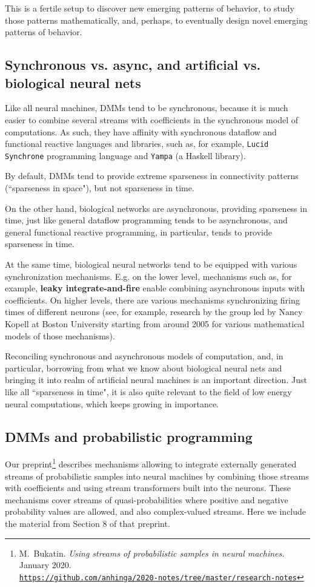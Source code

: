 \documentclass{article}
\begin{document}
This is a fertile setup to discover new emerging patterns of behavior, to study those patterns mathematically,
and, perhaps, to eventually design novel emerging patterns of behavior.

\subsection{Synchronous vs. async, and artificial vs. biological neural nets}

Like all neural machines, DMMs tend to be synchronous, because it is much easier to combine
several streams with coefficients in the synchronous model of computations. As such, they have affinity with
synchronous dataflow and functional reactive languages and libraries, such as, for example,
{\tt Lucid Synchrone} programming language and {\tt Yampa} (a Haskell library).

By default, DMMs tend to provide extreme sparseness in connectivity patterns (``sparseness in space"),
but not sparseness in time. 

On the other hand, biological networks are asynchronous, providing sparseness in time, just like
general dataflow programming tends to be asynchronous, and general functional reactive programming,
in particular, tends to provide sparseness in time.

At the same time, biological neural networks tend to be equipped with various synchronization mechanisms.
E.g. on the lower level, mechanisms such as, for example, {\bf leaky integrate-and-fire} enable combining
asynchronous inputs with coefficients. On higher levels, there are various mechanisms synchronizing firing times
of different neurons (see, for example, research by the group led by Nancy Kopell at Boston University starting from
around 2005 for various mathematical models of those mechanisms).

Reconciling synchronous and asynchronous models of computation, and, in particular, borrowing from
what we know about biological neural nets and bringing it into realm of artificial neural machines is
an important direction. Just like all ``sparseness in time", it is also quite relevant to the field of low energy
neural computations, which keeps growing in importance.

\subsection{DMMs and probabilistic programming}

Our preprint\footnote{M.~Bukatin. {\em Using streams of probabilistic samples in neural machines.} January 2020.\\
\href{https://github.com/anhinga/2020-notes/tree/master/research-notes}{\tt https://github.com/anhinga/2020-notes/tree/master/research-notes}} describes mechanisms allowing to integrate externally generated streams of
probabilistic samples into neural machines by
combining those streams with coefficients and using stream transformers built into the neurons.
These mechanisms cover streams of quasi-probabilities where positive and negative probability values are allowed,
and also complex-valued streams. Here we include the material from Section 8 of that preprint.
\end{document}
